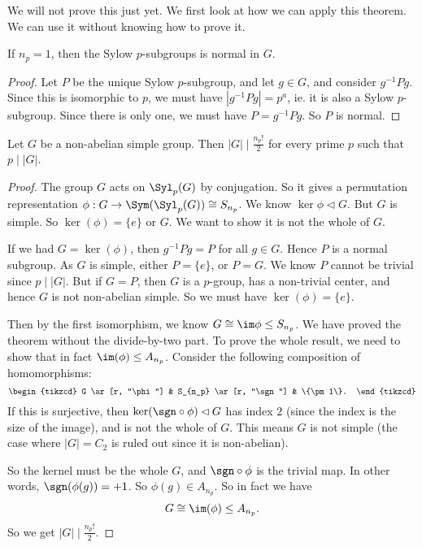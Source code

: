 \documentclass[a4paper]{article}
\begin{document}
We will not prove this just yet. We first look at how we can apply this theorem. We can use it without knowing how to prove it.

\begin{lemma}
  If $n_p = 1$, then the Sylow $p$-subgroups is normal in $G$.
\end{lemma}

\begin{proof}
  Let $P$ be the unique Sylow $p$-subgroup, and let $g \in G$, and consider $g^{-1}Pg$. Since this is isomorphic to $p$, we must have $|g^{-1} Pg| = p^a$, ie. it is also a Sylow $p$-subgroup. Since there is only one, we must have $P = g^{-1}Pg$. So $P$ is normal.
\end{proof}

\begin{cor}
  Let $G$ be a non-abelian simple group. Then $|G| \mid \frac{n_p!}{2}$ for every prime $p$ such that $p \mid |G|$.
\end{cor}

\begin{proof}
  The group $G$ acts on $\Syl_p(G)$ by conjugation. So it gives a permutation representation $\phi: G \to \Sym(\Syl_p(G)) \cong S_{n_p}$. We know $\ker \phi \lhd G$. But $G$ is simple. So $\ker(\phi)= \{e\}$ or $G$. We want to show it is not the whole of $G$.

  If we had $G = \ker(\phi)$, then $g^{-1} Pg = P$ for all $g \in G$. Hence $P$ is a normal subgroup. As $G$ is simple, either $P = \{e\}$, or $P = G$. We know $P$ cannot be trivial since $p \mid |G|$. But if $G = P$, then $G$ is a $p$-group, has a non-trivial center, and hence $G$ is not non-abelian simple. So we must have $\ker(\phi) = \{e\}$.

  Then by the first isomorphism, we know $G \cong \im \phi \leq S_{n_p}$. We have proved the theorem without the divide-by-two part. To prove the whole result, we need to show that in fact $\im (\phi) \leq A_{n_p}$. Consider the following composition of homomorphisms:
  \[
    \begin{tikzcd}
      G \ar[r, "\phi"] & S_{n_p} \ar[r, "\sgn"] & \{\pm 1\}.
    \end{tikzcd}
  \]
  If this is surjective, then $\ker (\sgn \circ \phi) \lhd G$ has index $2$ (since the index is the size of the image), and is not the whole of $G$. This means $G$ is not simple (the case where $|G| = C_2$ is ruled out since it is non-abelian).

  So the kernel must be the whole $G$, and $\sgn \circ \phi$ is the trivial map. In other words, $\sgn(\phi(g)) = +1$. So $\phi(g) \in A_{n_p}$. So in fact we have
  \[
    G \cong \im(\phi) \leq A_{n_p}.
  \]
  So we get $|G| \mid \frac{n_p!}{2}$.
\end{proof}
\end{document}
